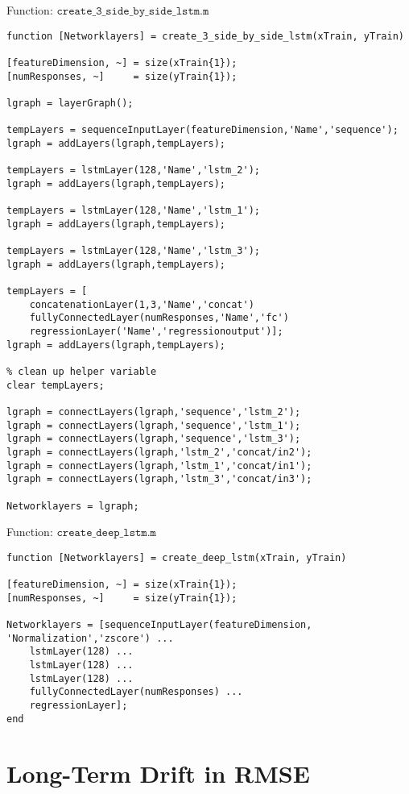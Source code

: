 Function: $\texttt{create\_3\_side\_by\_side\_lstm.m}$
\begin{lstlisting}
function [Networklayers] = create_3_side_by_side_lstm(xTrain, yTrain)

[featureDimension, ~] = size(xTrain{1});
[numResponses, ~]     = size(yTrain{1});

lgraph = layerGraph();

tempLayers = sequenceInputLayer(featureDimension,'Name','sequence');
lgraph = addLayers(lgraph,tempLayers);

tempLayers = lstmLayer(128,'Name','lstm_2');
lgraph = addLayers(lgraph,tempLayers);

tempLayers = lstmLayer(128,'Name','lstm_1');
lgraph = addLayers(lgraph,tempLayers);

tempLayers = lstmLayer(128,'Name','lstm_3');
lgraph = addLayers(lgraph,tempLayers);

tempLayers = [
    concatenationLayer(1,3,'Name','concat')
    fullyConnectedLayer(numResponses,'Name','fc')
    regressionLayer('Name','regressionoutput')];
lgraph = addLayers(lgraph,tempLayers);

% clean up helper variable
clear tempLayers;

lgraph = connectLayers(lgraph,'sequence','lstm_2');
lgraph = connectLayers(lgraph,'sequence','lstm_1');
lgraph = connectLayers(lgraph,'sequence','lstm_3');
lgraph = connectLayers(lgraph,'lstm_2','concat/in2');
lgraph = connectLayers(lgraph,'lstm_1','concat/in1');
lgraph = connectLayers(lgraph,'lstm_3','concat/in3');

Networklayers = lgraph;
\end{lstlisting}

Function: $\texttt{create\_deep\_lstm.m}$
\begin{lstlisting}
function [Networklayers] = create_deep_lstm(xTrain, yTrain)

[featureDimension, ~] = size(xTrain{1});
[numResponses, ~]     = size(yTrain{1});

Networklayers = [sequenceInputLayer(featureDimension, 'Normalization','zscore') ...
    lstmLayer(128) ...
    lstmLayer(128) ...
    lstmLayer(128) ...
    fullyConnectedLayer(numResponses) ...
    regressionLayer];
end
\end{lstlisting}

\section{Long-Term Drift in RMSE}

